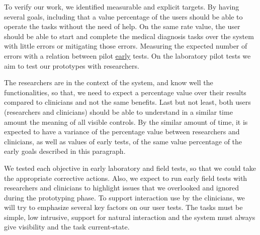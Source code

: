 To verify our work, we identified measurable and explicit targets. By having several goals, including that a value percentage of the users should be able to operate the tasks without the need of help. On the same rate value, the user should be able to start and complete the medical diagnosis tasks over the system with little errors or mitigating those errors. Measuring the expected number of errors with a relation between pilot \hyperlink{https://github.com/MIMBCD-UI/testing-guide-breast/tree/master/samples/test_4}{early} tests. On the laboratory pilot tests we aim to test our prototypes with researchers.

The researchers are in the context of the system, and know well the functionalities, so that, we need to expect a percentage value over their results compared to clinicians and not the same benefits. Last but not least, both users (researchers and clinicians) should be able to understand in a similar time amount the meaning of all visible controls. By the similar amount of time, it is expected to have a variance of the percentage value between researchers and clinicians, as well as values of early tests, of the same value percentage of the early goals described in this paragraph.

We tested each objective in early laboratory and field tests, so that we could take the appropriate corrective actions. Also, we expect to run early field tests with researchers and clinicians to highlight issues that we overlooked and ignored during the prototyping phase. To support interaction use by the clinicians, we will try to emphasize several key factors on our user tests. The tasks must be simple, low intrusive, support for natural interaction and the system must always give visibility and the task current-state.